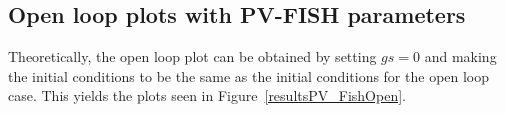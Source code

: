 \documentclass{article}
\begin{document}
\subsection{Open loop plots with PV-FISH parameters}

Theoretically, the open loop plot can be obtained by setting $gs = 0$ and making the initial conditions to be the same as the initial conditions for the open loop case. This yields the plots seen in Figure~\ref{resultsPV_FishOpen}.  

\begin{figure}[h!]
\centering
{}

\end{figure}
\end{document}
